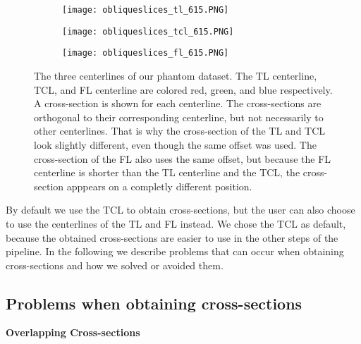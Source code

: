 \documentclass[thesis.tex]{subfiles}
\begin{document}
\begin{figure}
	\begin{subfigure}[t]{0.45\textwidth}
		\texttt{[image: obliqueslices\_tl\_615.PNG]}
	\caption{}		
	\end{subfigure}
\hspace{0.05\textwidth}
	\begin{subfigure}[t]{0.45\textwidth}
		\texttt{[image: obliqueslices\_tcl\_615.PNG]}		
\caption{}	
	\end{subfigure}
\centering
\begin{subfigure}[t]{0.45\textwidth}
		\texttt{[image: obliqueslices\_fl\_615.PNG]}		
\caption{}	
	\end{subfigure}
	\caption{The three centerlines of our phantom dataset. The TL centerline, TCL, and FL centerline are colored red, green, and blue respectively. A cross-section is shown for each centerline. The cross-sections are orthogonal to their corresponding centerline, but not necessarily to other centerlines. That is why the cross-section of the TL and TCL look slightly different, even though the same offset was used. The cross-section of the FL also uses the same offset, but because the FL centerline is shorter than the TL centerline and the TCL, the cross-section apppears on a completly different position.}
\label{fig:obliqueslices}
\end{figure}



By default we use the TCL to obtain cross-sections, but the user can also choose to use the centerlines of the TL and FL instead. We chose the TCL as default, because the obtained cross-sections are easier to use in the other steps of the pipeline.
In the following we describe problems that can occur when obtaining cross-sections and how we solved or avoided them. 

\subsection{Problems when obtaining cross-sections}

\textbf{Overlapping Cross-sections} 
\end{document}
